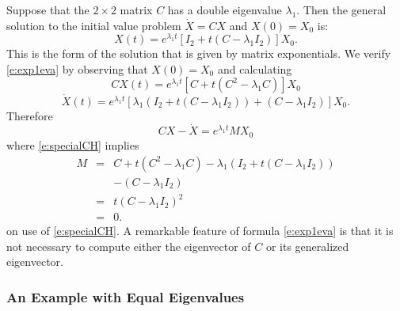\documentclass{ximera}
\begin{document}
Suppose that the $2\times 2$ matrix $C$ has a double eigenvalue $\lambda_1$.  
Then the general solution to the initial value problem 
$\dot{X}=CX$ and $X(0) = X_0$ is:
\begin{equation} \label{e:exp1eva}
X(t) = e^{\lambda_1 t} [I_2 + t(C-\lambda_1I_2)]X_0.
\end{equation}
This is the form of the solution that is given by matrix exponentials.
We verify \eqref{e:exp1eva} by observing that $X(0) = X_0$ and calculating  
\[
CX(t) =  e^{\lambda_1 t}[ C+ t(C^2-\lambda_1 C)]X_0 
\]
\[
\dot{X}(t) = e^{\lambda_1 t}[ \lambda_1  (I_2 + t(C-\lambda_1 I_2)) + (C-\lambda_1I_2)]X_0.
\]
Therefore 
\[
CX - \dot{X} = e^{\lambda_1 t} M  X_0
\]
where \eqref{e:specialCH} implies
\[
\begin{array}{rcl}
M & = & C+ t(C^2 - \lambda_1 C) - \lambda_1 (I_2 + t(C - \lambda_1 I_2)) \\
& & - (C - \lambda_1I_2)\\
& = & t(C - \lambda_1 I_2)^2 \\
& = & 0.
\end{array}
\]
on use of \eqref{e:specialCH}.  A remarkable feature of formula \eqref{e:exp1eva} is that it is not 
necessary to compute either the eigenvector of $C$ or its generalized eigenvector.
\subsubsection*{An Example with Equal Eigenvalues}
\end{document}
